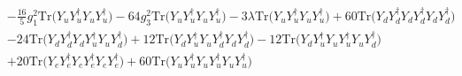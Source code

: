 {\begin{align}
 &-\frac{16}{5} g_{1}^{2} \mbox{Tr}\Big({Y_u  Y_{u}^{\dagger}  Y_u  Y_{u}^{\dagger}}\Big) -64 g_{3}^{2} \mbox{Tr}\Big({Y_u  Y_{u}^{\dagger}  Y_u  Y_{u}^{\dagger}}\Big) -3 \lambda \mbox{Tr}\Big({Y_u  Y_{u}^{\dagger}  Y_u  Y_{u}^{\dagger}}\Big) +60 \mbox{Tr}\Big({Y_d  Y_{d}^{\dagger}  Y_d  Y_{d}^{\dagger}  Y_d  Y_{d}^{\dagger}}\Big) \nonumber \\ 
 &-24 \mbox{Tr}\Big({Y_d  Y_{d}^{\dagger}  Y_d  Y_{u}^{\dagger}  Y_u  Y_{d}^{\dagger}}\Big) +12 \mbox{Tr}\Big({Y_d  Y_{u}^{\dagger}  Y_u  Y_{d}^{\dagger}  Y_d  Y_{d}^{\dagger}}\Big) -12 \mbox{Tr}\Big({Y_d  Y_{u}^{\dagger}  Y_u  Y_{u}^{\dagger}  Y_u  Y_{d}^{\dagger}}\Big) \nonumber \\ 
 &+20 \mbox{Tr}\Big({Y_e  Y_{e}^{\dagger}  Y_e  Y_{e}^{\dagger}  Y_e  Y_{e}^{\dagger}}\Big) +60 \mbox{Tr}\Big({Y_u  Y_{u}^{\dagger}  Y_u  Y_{u}^{\dagger}  Y_u  Y_{u}^{\dagger}}\Big) 
\end{align}} 
